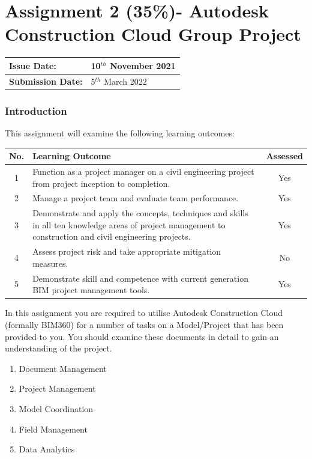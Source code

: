 
	

\part*{Assignment 2 (35\%)- Autodesk Construction Cloud Group Project}


\begin{tabularx}{\textwidth}{ |X|X| }
	\hline
	\textbf{Issue Date:} & 10$^{th}$ November 2021\\
	\hline 
	\textbf{Submission Date:}  & 5$^{th}$ March 2022\\
	\hline
\end{tabularx}

\section*{Introduction}

This assignment will examine the following learning outcomes:\\

\begin{tabularx}{\textwidth}{ |c|X|c| }
	\hline
	\textbf{No.} & \textbf{Learning Outcome} & \textbf{Assessed} \\
	\hline 
	1  & Function as a project manager on a civil engineering project from project inception to completion. & Yes \\
	2  & Manage a project team and evaluate team performance. & Yes \\
	3  & Demonstrate and apply the concepts, techniques and skills in all ten knowledge areas of project management to construction and civil engineering projects. & Yes \\
	4  & Assess project risk and take appropriate mitigation measures. & No \\
	5  & Demonstrate skill and competence with current generation BIM project management tools. & Yes \\
	\hline
\end{tabularx}


In this assignment you are required to utilise Autodesk Construction Cloud (formally BIM360) for a number of tasks on a Model/Project that has been provided to you.  You should examine these documents in detail to gain an understanding of the project.\\

\begin{enumerate}
	\item Document Management 
	\item Project Management
	\item Model Coordination
	\item Field Management
	\item Data Analytics
\end{enumerate}


